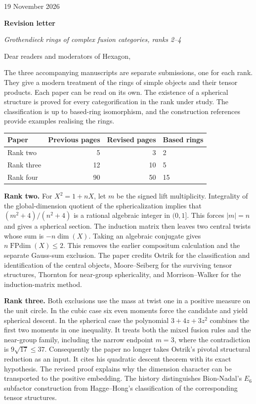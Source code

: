 \documentclass[11pt,a4paper]{article}
\begin{document}
{\small 19 November 2026}\par
{\Large\bfseries Revision letter}\par
{\large\itshape Grothendieck rings of complex fusion categories, ranks 2--4}\par
\medskip
Dear readers and moderators of Hexagon,

The three accompanying manuscripts are separate submissions, one for each rank.
They give a modern treatment of the rings of simple objects and their tensor products.
Each paper can be read on its own. The existence of a spherical structure is proved for
every categorification in the rank under study. The classification is up to
based-ring isomorphism, and the construction references provide examples realising the rings.

\begin{center}
\begin{tabular}{@{}lrrl@{}}\toprule
Paper & Previous pages & Revised pages & Based rings \\ \midrule
Rank two & 5 & 3 & 2\\
Rank three & 12 & 10 & 5\\
Rank four & 90 & 50 & 15\\ \bottomrule
\end{tabular}
\end{center}

\textbf{Rank two.}
For $X^2=1+nX$, let $m$ be the signed lift multiplicity. Integrality of the
global-dimension quotient of the sphericalization implies that
$(m^2+4)/(n^2+4)$ is a rational algebraic integer in $(0,1]$. This forces
$|m|=n$ and gives a spherical section. The induction matrix then leaves two
central twists whose sum is $-n\dim(X)$. Taking an algebraic conjugate gives
$n\operatorname{FPdim}(X)\le2$. This removes the earlier compositum calculation
and the separate Gauss-sum exclusion. The paper credits Ostrik for the
classification and identification of the central objects, Moore--Seiberg
for the surviving tensor structures, Thornton for near-group sphericality,
and Morrison--Walker for the induction-matrix method.

\textbf{Rank three.}
Both exclusions use the mass at twist one in a positive measure on the unit
circle. In the cubic case six even moments force the candidate and yield
spherical descent. In the spherical case the polynomial $3+4z+3z^2$
combines the first two moments in one inequality. It treats both the mixed
fusion rules and the near-group family, including the narrow endpoint
$m=3$, where the contradiction is $9\sqrt{17}\le37$. Consequently the
paper no longer takes Ostrik's pivotal structural reduction as an input.
It cites his quadratic descent theorem with its exact hypothesis.
The revised proof explains why the dimension character can be transported
to the positive embedding. The history distinguishes Bion-Nadal's
$E_6$ subfactor construction from Hagge--Hong's classification of the
corresponding tensor structures.
\end{document}
